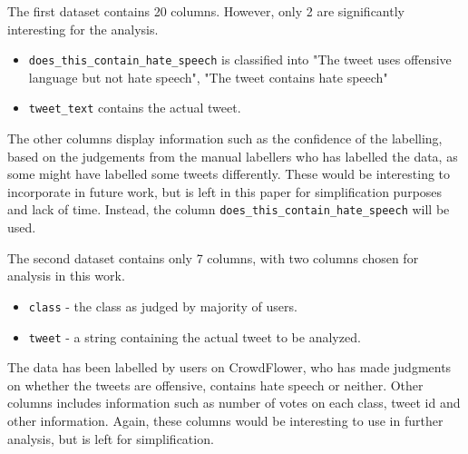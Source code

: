 \documentclass[twocolumn]{article}
\begin{document}

The first dataset contains 20 columns. However, only 2 are significantly interesting for the analysis. 
\begin{itemize}
\item \verb|does_this_contain_hate_speech| is classified into "The tweet uses offensive language but not hate speech", "The tweet contains hate speech"
\item \verb|tweet_text| contains the actual tweet.
\end{itemize}
 
The other columns display information such as the confidence of the labelling, based on the judgements from the manual labellers who has labelled the data, as some might have labelled some tweets differently. These would be interesting to incorporate in future work, but is left in this paper for simplification purposes and lack of time. Instead, the column \verb|does_this_contain_hate_speech| will be used. 

The second dataset contains only 7 columns, with two columns chosen for analysis in this work. 

\begin{itemize}
\item \verb|class| - the class as judged by majority of users. 
\item \verb|tweet| - a string containing the actual tweet to be analyzed. 
\end{itemize}

The data has been labelled by users on CrowdFlower, who has made judgments on whether the tweets are offensive, contains hate speech or neither. Other columns includes information such as number of votes on each class, tweet id and other information. Again, these columns would be interesting to use in further analysis, but is left for simplification. 
\end{document}

